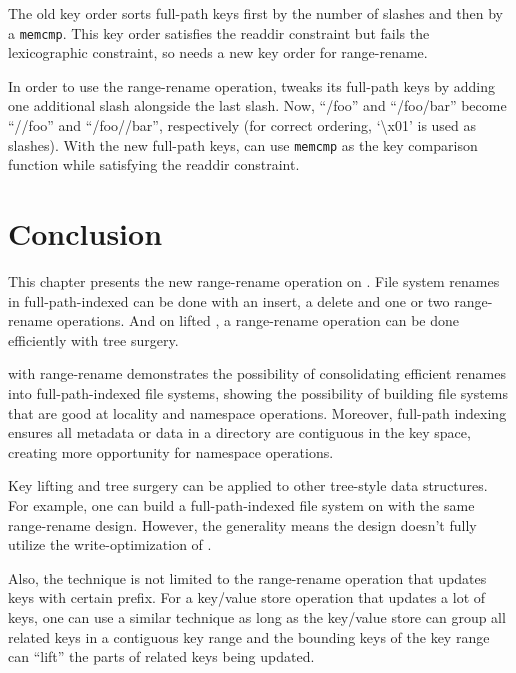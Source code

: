 The old \betrfs key order sorts full-path keys first by the number of slashes
and then by a \texttt{memcmp}.
This key order satisfies the readdir constraint but fails the lexicographic
constraint, so \betrfs needs a new key order for range-rename.

In order to use the range-rename operation, \betrfs tweaks its full-path keys by
adding one additional slash alongside the last slash.
Now, ``/foo'' and ``/foo/bar'' become ``//foo'' and ``/foo//bar'', respectively
(for correct ordering, `\textbackslash x01' is used as slashes).
With the new full-path keys, \betrfs can use \texttt{memcmp} as the key
comparison function while satisfying the readdir constraint.

\section{Conclusion}

This chapter presents the new range-rename operation on \bets.
File system renames in full-path-indexed \betrfs can be done with an insert,
a delete and one or two range-rename operations.
And on lifted \bets, a range-rename operation can be done efficiently with
tree surgery.

\betrfs with range-rename demonstrates the possibility of consolidating
efficient renames into full-path-indexed file systems, showing the possibility
of building file systems that are good at locality and namespace operations.
Moreover, full-path indexing ensures all metadata or data in a directory are
contiguous in the key space,
creating more opportunity for namespace operations.

Key lifting and tree surgery can be applied to other tree-style data structures.
For example, one can build a full-path-indexed file system on \btrees
with the same range-rename design.
However, the generality means the design doesn't fully utilize the
write-optimization of \bets.

Also, the technique is not limited to the range-rename operation that updates
keys with certain prefix.
For a key/value store operation that updates a lot of keys,
one can use a similar technique as long as the key/value store can group all
related keys in a contiguous key range and
the bounding keys of the key range can ``lift'' the parts of related keys being
updated.


